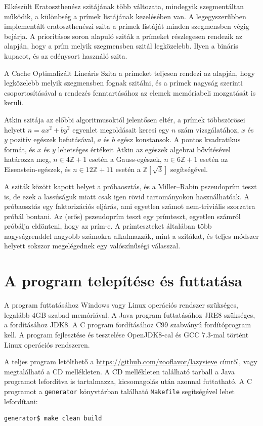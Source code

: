 Elkészült Eratoszthenész szitájának több változata, mindegyik szegmentáltan működik, a különbség a prímek listájának kezelésében van.
A legegyszerűbben implementált eratoszthenészi szita a prímek listáját minden szegmensben végig bejárja.
A prioritásos soron alapuló sziták a prímeket részlegesen rendezik az alapján, hogy a prím melyik szegmensben szitál legközelebb.
Ilyen a bináris kupacot, és az edénysort használó szita.

A Cache Optimalizált Lineáris Szita\cite{cols} a prímeket teljesen rendezi az alapján, hogy legközelebb melyik szegmensben fognak szitálni, és a prímek nagyság szerinti csoportosításával a rendezés fenntartásához az elemek memóriabeli mozgatását is kerüli.

Atkin szitája\cite{atkin} az előbbi algoritmusoktól jelentősen eltér, a prímek többszörösei
helyett $n=ax^2+by^2$ egyenlet megoldásait keresi egy $n$ szám vizsgálatához, $x$ és $y$ pozitív egészek befutásával, $a$ és $b$ egész konstansok.
A pontos kvadratikus formát, és $x$ és $y$ lehetséges értékeit Atkin az egészek algebrai bővítésével határozza meg, $n \in 4\mathbb{Z}+1$ esetén a Gauss-egészek, $n \in 6\mathbb{Z}+1$ esetén az Eisenstein-egészek, és $n \in 12\mathbb{Z}+11$ esetén a $\mathbb{Z}[\sqrt{3}]$ segítségével.

A sziták között kapott helyet a próbaosztás, és a Miller–Rabin pszeudoprím teszt \cite{miller} is, de ezek a lassúságuk miatt csak igen rövid tartományokon használhatóak.
A próbaosztás egy faktorizációs eljárás, ami egyetlen számot nem-triviális szorzatra próbál bontani.
Az (erős) pszeudoprím teszt egy prímteszt, egyetlen számról próbálja eldönteni, hogy az prím-e.
A prímteszteket általában több nagyságrenddel nagyobb számokra alkalmazzák, mint a szitákat, és teljes módszer helyett sokszor megelégednek egy valószínűségi válasszal.

\section{A program telepítése és futtatása}

A program futtatásához Windows vagy Linux operációs rendszer szükséges, legalább 4GB szabad memóriával.
A Java program futtatásához JRE8 szükséges, a fordításához JDK8.
A C program fordításához C99 szabványú fordítóprogram kell.
A program fejlesztése és tesztelése OpenJDK8-cal és GCC 7.3-mal történt Linux operációs rendszeren.

A teljes program letölthető a \url{https://github.com/zooflavor/lazysieve} címről, vagy megtalálható a CD mellékleten.
A CD mellékleten található tarball a Java programot lefordítva is tartalmazza, kicsomagolás után azonnal futtatható.
A C programot a \texttt{generator} könyvtárban található \texttt{Makefile} segítségével lehet lefordítani:
\begin{lstlisting}[language=bash]
generator$ make clean build
\end{lstlisting}

